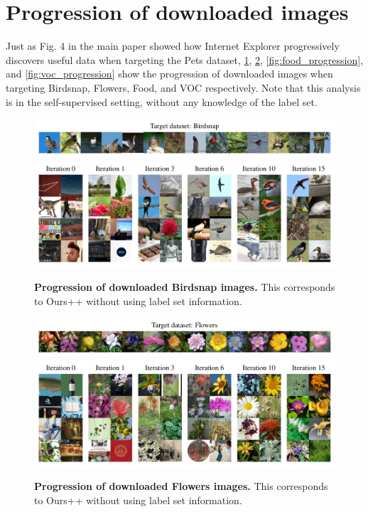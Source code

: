 \section{Progression of downloaded images}
\label{sec:progression_downloaded_imgs}
Just as Fig. 4 in the main paper showed how Internet Explorer progressively discovers useful data when targeting the Pets dataset, \cref{fig:birdsnap_progression}, \cref{fig:flowers_progression}, \cref{fig:food_progression}, and \cref{fig:voc_progression} show the progression of downloaded images when targeting Birdsnap, Flowers, Food, and VOC respectively. Note that this analysis is in the self-supervised setting, without any knowledge of the label set. 

\begin{figure}
    \centering
    \includegraphics{figures/birdsnap_targets.pdf} \\
    \vspace{-0.8em}
    \includegraphics{figures/birdsnap-progression-1146-2col.pdf}
    \caption{\textbf{Progression of downloaded Birdsnap images.} This corresponds to Ours++ without using label set information. }
    \label{fig:birdsnap_progression}
\end{figure}

\begin{figure}
    \centering
    \includegraphics{figures/flowers_targets.pdf} \\
    \vspace{-0.8em}
    \includegraphics{figures/flowers-progression-1150-2col.pdf}
    \caption{\textbf{Progression of downloaded Flowers images.} This corresponds to Ours++ without using label set information. }
    \label{fig:flowers_progression}
\end{figure}

